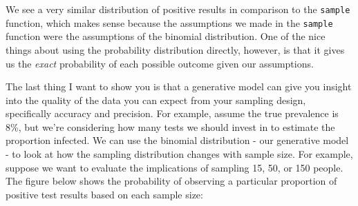 \documentclass[
]{book}
\begin{document}
We see a very similar distribution of positive results in comparison to
the \texttt{sample} function, which makes sense because the assumptions we made
in the \texttt{sample} function were the assumptions of the binomial
distribution. One of the nice things about using the probability
distribution directly, however, is that it gives us the \emph{exact}
probability of each possible outcome given our assumptions.

The last thing I want to show you is that a generative model can give
you insight into the quality of the data you can expect from your
sampling design, specifically accuracy and precision. For example,
assume the true prevalence is 8\%, but we're considering how many tests
we should invest in to estimate the proportion infected. We can use the
binomial distribution - our generative model - to look at how the
sampling distribution changes with sample size. For example, suppose we
want to evaluate the implications of sampling 15, 50, or 150 people. The
figure below shows the probability of observing a particular proportion
of positive test results based on each sample size:
\end{document}
